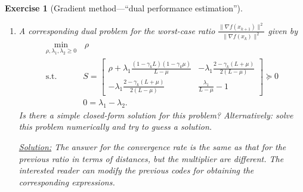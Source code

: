\documentclass[11pt,a4paper]{article}
\newcommand{\correction}[1]{{{\color{blue}\underline{Solution:} #1}}}
\newcommand{\correction}[1]{}
\newtheorem{exercise}{Exercise}
\begin{document}
\begin{exercise}[Gradient method---``dual performance estimation'']
\begin{enumerate}
	
	
	
	
	\item A corresponding dual problem for the worst-case ratio $\frac{\|\nabla f(x_{k+1})\|^2}{\|\nabla f(x_k)\|^2}$ given by
	\begin{equation}\label{eq:ex1_dual2}	 
		\begin{aligned}
			\min_{\rho,\lambda_1,\lambda_2\geqslant 0} & \,\rho\\
			\text{s.t. }& S=\begin{bmatrix}
		\rho+\lambda_1 \frac{(1-\gamma_k L)(1-\gamma_k \mu)}{L-\mu} & -\lambda_1\frac{2-\gamma_k(L+\mu)}{2(L-\mu)}\\
		-\lambda_1\frac{2-\gamma_k(L+\mu)}{2(L-\mu)} & \frac{\lambda_1}{L-\mu}-1
			\end{bmatrix}\succcurlyeq 0\\
			&0=\lambda_1-\lambda_2.
		\end{aligned}
		\end{equation} Is there a simple closed-form solution for this problem? Alternatively: solve this problem numerically and try to guess a solution.
		
	\correction{The answer for the convergence rate is the same as that for the previous ratio in terms of distances, but the multiplier are different. The interested reader can modify the previous codes for obtaining the corresponding expressions.}
	

\end{enumerate}
\end{exercise}
\end{document}
